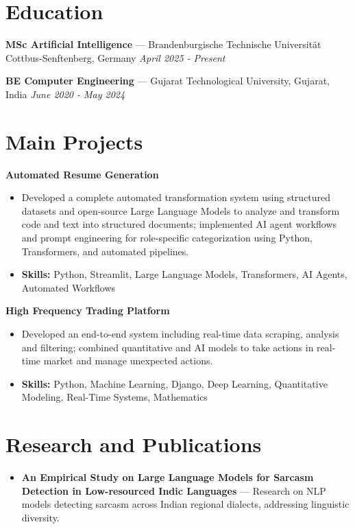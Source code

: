 \documentclass[a4paper,10pt]{article}
\begin{document}
\section*{Education}
\textbf{MSc Artificial Intelligence} — Brandenburgische Technische Universität Cottbus-Senftenberg, Germany \hfill \textit{April 2025 - Present}\par
\vspace{1.5pt}
\textbf{BE Computer Engineering} — Gujarat Technological University, Gujarat, India \hfill \textit{June 2020 - May 2024}\par

\section*{Main Projects}
\textbf{Automated Resume Generation}\par
\vspace{1pt}
\begin{itemize}
  \item Developed a complete automated transformation system using structured datasets and open-source Large Language Models to analyze and transform code and text into structured documents; implemented AI agent workflows and prompt engineering for role-specific categorization using Python, Transformers, and automated pipelines.
  \item \textbf{Skills:} Python, Streamlit, Large Language Models, Transformers, AI Agents, Automated Workflows
\end{itemize}
\vspace{3pt}
\textbf{High Frequency Trading Platform}\par
\vspace{1pt}
\begin{itemize}
  \item Developed an end-to-end system including real-time data scraping, analysis and filtering; combined quantitative and AI models to take actions in real-time market and manage unexpected actions.
  \item \textbf{Skills:} Python, Machine Learning, Django, Deep Learning, Quantitative Modeling, Real-Time Systems, Mathematics
\end{itemize}

\section*{Research and Publications}
\begin{itemize}
\item \textbf{An Empirical Study on Large Language Models for Sarcasm Detection in Low-resourced Indic Languages} — Research on NLP models detecting sarcasm across Indian regional dialects, addressing linguistic diversity.
\end{itemize}
\end{document}
